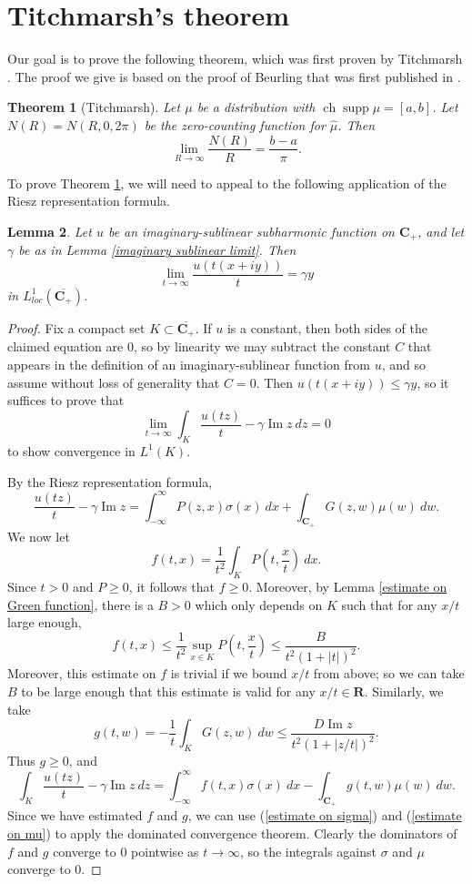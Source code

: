 \documentclass[12pt]{report}
\newcommand{\RR}{\mathbf{R}}
\newcommand{\CC}{\mathbf{C}}
\DeclareMathOperator{\ch}{ch}
\DeclareMathOperator{\supp}{supp}
\renewcommand{\Im}{\operatorname{Im}}
\newtheorem{theorem}{Theorem}[chapter]
\newtheorem{lemma}[theorem]{Lemma}
\theoremstyle{definition}
\begin{document}
\section{Titchmarsh's theorem}
\label{Titchmarsh section}
Our goal is to prove the following theorem, which was first proven by Titchmarsh \cite{titchmarsh1926zeros}.
The proof we give is based on the proof of Beurling that was first published in \cite[Chapter XVI]{hormander2004analysis}.
\begin{theorem}[Titchmarsh]
    \label{Titchmarsh I}
    Let $\mu$ be a distribution with $\ch \supp \mu = [a, b]$. Let $N(R) = N(R, 0, 2\pi)$ be the zero-counting function for $\hat \mu$. Then
    $$\lim_{R \to \infty} \frac{N(R)}{R} = \frac{b-a}{\pi}.$$
\end{theorem}
To prove Theorem \ref{Titchmarsh I}, we will need to appeal to the following application of the Riesz representation formula.
\begin{lemma}
    \label{gamma in mean}
    Let $u$ be an imaginary-sublinear subharmonic function on $\CC_+$, and let $\gamma$ be as in Lemma \ref{imaginary sublinear limit}. Then
$$\lim_{t \to \infty} \frac{u(t(x + iy))}{t} = \gamma y$$
    in $L^1_{loc}(\overline{\CC_+})$.
\end{lemma}
\begin{proof}
    Fix a compact set $K \subset \overline{\CC_+}$. If $u$ is a constant, then both sides of the claimed equation are $0$, so by linearity we may subtract the constant $C$ that appears in the definition of an imaginary-sublinear function from $u$, and so assume without loss of generality that $C = 0$. Then $u(t(x+iy)) \leq \gamma y$, so it suffices to prove that
$$\lim_{t \to \infty} \int_K \frac{u(tz)}{t} - \gamma \Im z ~dz = 0$$
    to show convergence in $L^1(K)$.

    By the Riesz representation formula,
$$\frac{u(tz)}{t} - \gamma \Im z = \int_{-\infty}^\infty P(z, x) \sigma(x) ~dx + \int_{\CC_+} G(z, w) \mu(w) ~dw.$$
    We now let
    $$f(t, x) = \frac{1}{t^2} \int_K P\left(t, \frac{x}{t}\right) ~dx.$$
    Since $t > 0$ and $P \geq 0$, it follows that $f \geq 0$. Moreover, by Lemma \ref{estimate on Green function}, there is a $B > 0$ which only depends on $K$ such that for any $x/t$ large enough,
    $$f(t, x) \leq \frac{1}{t^2} \sup_{x \in K} P\left(t, \frac{x}{t}\right) \leq \frac{B}{t^2(1 + |t|)^2}.$$
    Moreover, this estimate on $f$ is trivial if we bound $x/t$ from above; so we can take $B$ to be large enough that this estimate is valid for any $x/t \in \RR$. Similarly, we take
    $$g(t, w) = -\frac{1}{t} \int_K G(z, w) ~dw \leq \frac{D \Im z}{t^2(1+|z/t|)^2}.$$
    Thus $g \geq 0$, and
    $$\int_K \frac{u(tz)}{t} - \gamma \Im z ~dz = \int_{-\infty}^\infty f(t, x) \sigma(x) ~dx - \int_{\CC_+} g(t, w) \mu(w) ~dw.$$
    Since we have estimated $f$ and $g$, we can use (\ref{estimate on sigma}) and (\ref{estimate on mu}) to apply the dominated convergence theorem. Clearly the dominators of $f$ and $g$ converge to $0$ pointwise as $t \to \infty$, so the integrals against $\sigma$ and $\mu$ converge to $0$.
\end{proof}
\end{document}
